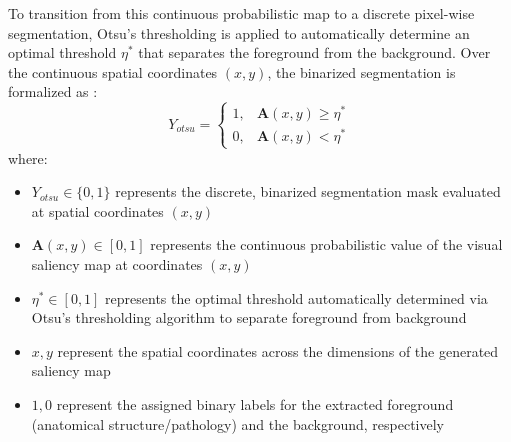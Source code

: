 To transition from this continuous probabilistic map to a discrete pixel-wise segmentation, Otsu's thresholding is applied to automatically determine an optimal threshold $\eta^*$ that separates the foreground from the background. Over the continuous spatial coordinates $(x,y)$, the binarized segmentation is formalized as \cite{medclipsam}:
\begin{equation}
Y_{otsu} = \begin{cases} 1, & \mathbf{A}(x,y) \ge \eta^* \\ 0, & \mathbf{A}(x,y) < \eta^* \end{cases}
\end{equation}
where:
\begin{itemize}
\item $Y_{otsu} \in \{0, 1\}$ represents the discrete, binarized segmentation mask evaluated at spatial coordinates $(x,y)$
\item $\mathbf{A}(x,y) \in [0,1]$ represents the continuous probabilistic value of the visual saliency map at coordinates $(x,y)$
\item $\eta^* \in [0,1]$ represents the optimal threshold automatically determined via Otsu's thresholding algorithm to separate foreground from background
\item $x, y$ represent the spatial coordinates across the dimensions of the generated saliency map
\item $1, 0$ represent the assigned binary labels for the extracted foreground (anatomical structure/pathology) and the background, respectively
\end{itemize}

